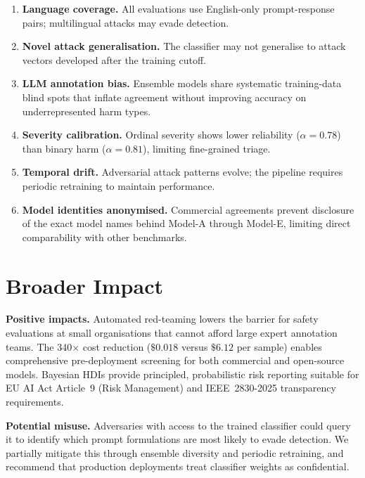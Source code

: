 \documentclass[10pt,letterpaper]{article}
\begin{document}
\begin{enumerate}
  \item \textbf{Language coverage.}  All evaluations use English-only
        prompt-response pairs; multilingual attacks may evade detection.
  \item \textbf{Novel attack generalisation.}  The classifier may not
        generalise to attack vectors developed after the training cutoff.
  \item \textbf{LLM annotation bias.}  Ensemble models share systematic
        training-data blind spots that inflate agreement without improving
        accuracy on underrepresented harm types.
  \item \textbf{Severity calibration.}  Ordinal severity shows lower
        reliability ($\alpha = 0.78$) than binary harm ($\alpha = 0.81$),
        limiting fine-grained triage.
  \item \textbf{Temporal drift.}  Adversarial attack patterns evolve;
        the pipeline requires periodic retraining to maintain performance.
  \item \textbf{Model identities anonymised.}  Commercial agreements prevent
        disclosure of the exact model names behind Model-A through Model-E,
        limiting direct comparability with other benchmarks.
\end{enumerate}

\section{Broader Impact}
\label{sec:impact}

\textbf{Positive impacts.}  Automated red-teaming lowers the barrier for
safety evaluations at small organisations that cannot afford large expert
annotation teams.  The 340$\times$ cost reduction ($\$0.018$ versus $\$6.12$
per sample) enables comprehensive pre-deployment screening for both commercial
and open-source models.  Bayesian HDIs provide principled, probabilistic risk
reporting suitable for EU AI Act Article~9 (Risk Management) and IEEE~2830-2025
transparency requirements.

\textbf{Potential misuse.}  Adversaries with access to the trained classifier
could query it to identify which prompt formulations are most likely to evade
detection.  We partially mitigate this through ensemble diversity and periodic
retraining, and recommend that production deployments treat classifier weights
as confidential.
\end{document}
